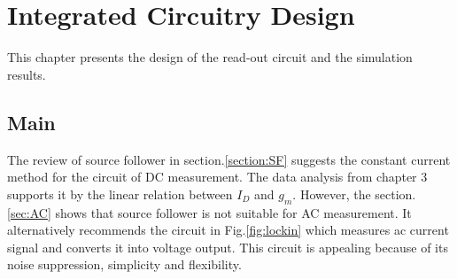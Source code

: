\chapter{Integrated Circuitry Design}
This chapter presents the design of the read-out circuit and the simulation results.


\section{Main}
The review of source follower in section.\ref{section:SF} suggests the constant current method for the circuit of DC measurement.
The data analysis from chapter 3 supports it by the linear relation between $I_D$ and $g_m$.
However, the section.\ref{sec:AC} shows that source follower is not suitable for AC measurement.
It alternatively recommends the circuit in Fig.\ref{fig:lockin} which measures ac current signal and converts it into voltage output.
This circuit is appealing because of its noise suppression, simplicity and flexibility. 


